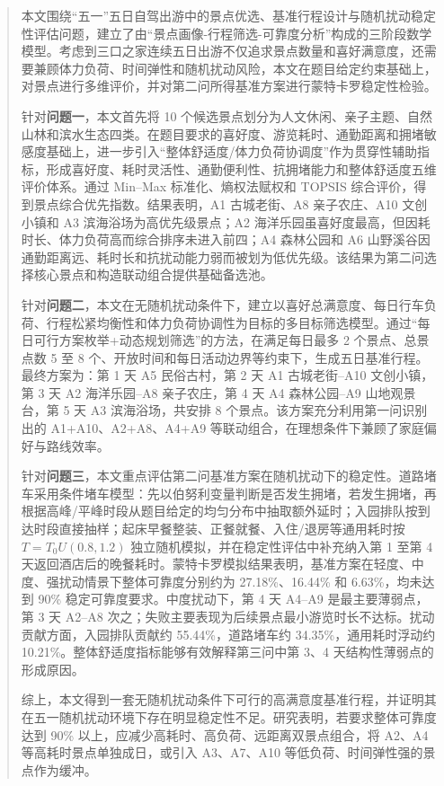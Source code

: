 \documentclass[UTF8,a4paper,12pt]{ctexart}
\begin{document}
\begin{abstract}
本文围绕“五一”五日自驾出游中的景点优选、基准行程设计与随机扰动稳定性评估问题，建立了由“景点画像-行程筛选-可靠度分析”构成的三阶段数学模型。考虑到三口之家连续五日出游不仅追求景点数量和喜好满意度，还需要兼顾体力负荷、时间弹性和随机扰动风险，本文在题目给定约束基础上，对景点进行多维评价，并对第二问所得基准方案进行蒙特卡罗稳定性检验。

针对\textbf{问题一}，本文首先将 10 个候选景点划分为人文休闲、亲子主题、自然山林和滨水生态四类。在题目要求的喜好度、游览耗时、通勤距离和拥堵敏感度基础上，进一步引入“整体舒适度/体力负荷协调度”作为贯穿性辅助指标，形成喜好度、耗时灵活性、通勤便利性、抗拥堵能力和整体舒适度五维评价体系。通过 Min--Max 标准化、熵权法赋权和 TOPSIS 综合评价，得到景点综合优先指数。结果表明，A1 古城老街、A8 亲子农庄、A10 文创小镇和 A3 滨海浴场为高优先级景点；A2 海洋乐园虽喜好度最高，但因耗时长、体力负荷高而综合排序未进入前四；A4 森林公园和 A6 山野溪谷因通勤距离远、耗时长和抗扰动能力弱而被划为低优先级。该结果为第二问选择核心景点和构造联动组合提供基础备选池。

针对\textbf{问题二}，本文在无随机扰动条件下，建立以喜好总满意度、每日行车负荷、行程松紧均衡性和体力负荷协调性为目标的多目标筛选模型。通过“每日可行方案枚举+动态规划筛选”的方法，在满足每日最多 2 个景点、总景点数 5 至 8 个、开放时间和每日活动边界等约束下，生成五日基准行程。最终方案为：第 1 天 A5 民俗古村，第 2 天 A1 古城老街--A10 文创小镇，第 3 天 A2 海洋乐园--A8 亲子农庄，第 4 天 A4 森林公园--A9 山地观景台，第 5 天 A3 滨海浴场，共安排 8 个景点。该方案充分利用第一问识别出的 A1+A10、A2+A8、A4+A9 等联动组合，在理想条件下兼顾了家庭偏好与路线效率。

针对\textbf{问题三}，本文重点评估第二问基准方案在随机扰动下的稳定性。道路堵车采用条件堵车模型：先以伯努利变量判断是否发生拥堵，若发生拥堵，再根据高峰/平峰时段从题目给定的均匀分布中抽取额外延时；入园排队按到达时段直接抽样；起床早餐整装、正餐就餐、入住/退房等通用耗时按 $T=T_0U(0.8,1.2)$ 独立随机模拟，并在稳定性评估中补充纳入第 1 至第 4 天返回酒店后的晚餐耗时。蒙特卡罗模拟结果表明，基准方案在轻度、中度、强扰动情景下整体可靠度分别约为 27.18\%、16.44\% 和 6.63\%，均未达到 90\% 稳定可靠度要求。中度扰动下，第 4 天 A4--A9 是最主要薄弱点，第 3 天 A2--A8 次之；失败主要表现为后续景点最小游览时长不达标。扰动贡献方面，入园排队贡献约 55.44\%，道路堵车约 34.35\%，通用耗时浮动约 10.21\%。整体舒适度指标能够有效解释第三问中第 3、4 天结构性薄弱点的形成原因。

综上，本文得到一套无随机扰动条件下可行的高满意度基准行程，并证明其在五一随机扰动环境下存在明显稳定性不足。研究表明，若要求整体可靠度达到 90\% 以上，应减少高耗时、高负荷、远距离双景点组合，将 A2、A4 等高耗时景点单独成日，或引入 A3、A7、A10 等低负荷、时间弹性强的景点作为缓冲。
\end{abstract}
\end{document}

